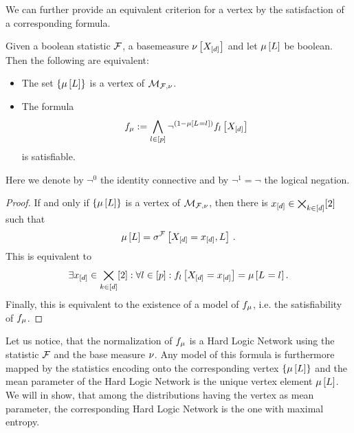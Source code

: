 We can further provide an equivalent criterion for a vertex by the satisfaction of a corresponding formula.

\begin{theorem}
    Given a boolean statistic $\mathcal{F}$, a basemeasure $\nu\left[X_{[d]}\right]$ and let $\mu\left[L\right]$ be boolean.
    Then the following are equivalent:
    \begin{itemize}
        \item The set $\{\mu\left[L\right]\}$ is a vertex of $\mathcal{M}_{\mathcal{F},\nu}$.
        \item The formula
        \begin{align*}
            f_{\mu} := \bigwedge_{l\in[p]} \lnot^{(1-\mu\left[L_{}=l_{}\right])} f_{l}\left[X_{[d]}\right]
        \end{align*}
        is satisfiable.
    \end{itemize}
    Here we denote by $\lnot^0$ the identity connective and by $\lnot^1=\lnot$ the logical negation.
\end{theorem}
\begin{proof}
    If and only if $\{\mu\left[L\right]\}$ is a vertex of $\mathcal{M}_{\mathcal{F},\nu}$, then there is $x_{[d]}\in\bigtimes_{k\in[d]}[2]$ such that %
    \begin{align*}
        \mu\left[L\right] = \sigma^{\mathcal{F}}\left[X_{[d]}=x_{[d]},L\right] \, .
    \end{align*}
    This is equivalent to
    \begin{align*}
        \exists{x_{[d]}\in\bigtimes_{k\in[d]}[2]}: \forall{l\in[p]}:{f_{l}\left[X_{[d]}=x_{[d]}\right]=\mu\left[L_{}=l_{}\right]} \, .
    \end{align*}
    Finally, this is equivalent to the existence of a model of $f_{\mu}$, i.e. the satisfiability of $f_{\mu}$.
\end{proof}

Let us notice, that the normalization of $f_{\mu}$ is a Hard Logic Network using the statistic $\mathcal{F}$ and the base measure $\nu$.
Any model of this formula is furthermore mapped by the statistics encoding onto the corresponding vertex $\{\mu\left[L\right]\}$ and the mean parameter of the Hard Logic Network is the unique vertex element $\mu\left[L\right]$.
We will in  show, that among the distributions having the vertex as mean parameter, the corresponding Hard Logic Network is the one with maximal entropy.




